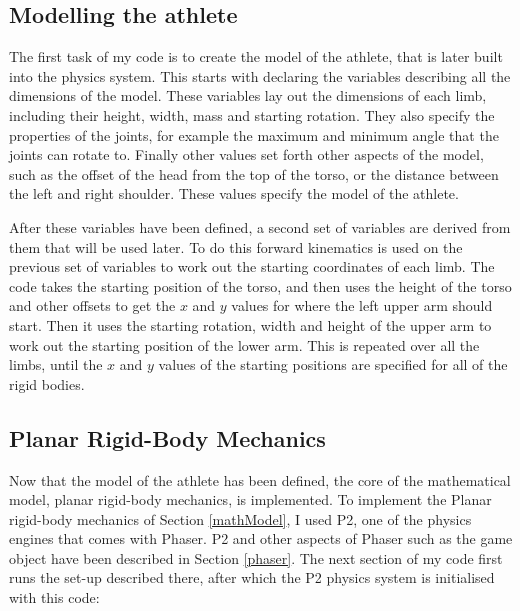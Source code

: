 \documentclass[12pt,a4paper,twoside,openright]{report}
\begin{document}
\subsection{Modelling the athlete}
\label{sec:athleteModel}
The first task of my code is to create the model of the athlete, that is later built into the physics system. This starts with declaring the variables describing all the dimensions of the model.
These variables lay out the dimensions of each limb, including their height, width, mass and starting rotation. They also specify the properties of the joints, for example the maximum and minimum angle that the joints can rotate to. Finally other values set forth other aspects of the model, such as the offset of the head from the top of the torso, or the distance between the left and right shoulder. 
These values specify the model of the athlete.

After these variables have been defined, a second set of variables are derived from them that will be used later. To do this forward kinematics is used on the previous set of variables to work out the starting coordinates of each limb. The code takes the starting position of the torso, and then uses the height of the torso and other offsets to get the $x$ and $y$ values for where the left upper arm should start. Then it uses the starting rotation, width and height of the upper arm to work out the starting position of the lower arm. This is repeated over all the limbs, until the $x$ and $y$ values of the starting positions are specified for all of the rigid bodies.




\subsection{Planar Rigid-Body Mechanics}
Now that the model of the athlete has been defined, the core of the mathematical model, planar rigid-body mechanics, is implemented. To implement the Planar rigid-body mechanics of Section \ref{mathModel}, I used P2, one of the physics engines that comes with Phaser.
P2 and other aspects of Phaser such as the game object have been described in Section \ref{phaser}.
The next section of my code first runs the set-up described there, after which the P2 physics system is initialised with this code:
\end{document}

